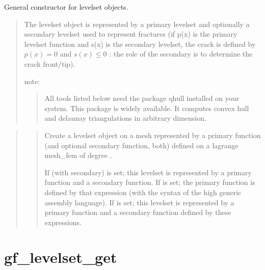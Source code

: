 \documentclass[a4paper,11pt,english]{sphinxmanual}
\begin{document}
\sphinxAtStartPar
{}

\sphinxAtStartPar
General constructor for levelset objects.
\begin{quote}

\sphinxAtStartPar
The level\sphinxhyphen{}set object is represented by a primary level\sphinxhyphen{}set and optionally
a secondary level\sphinxhyphen{}set used to represent fractures (if p(x) is the primary
level\sphinxhyphen{}set function and s(x) is the secondary level\sphinxhyphen{}set, the crack is
defined by \(p(x)=0\) and \(s(x)\leq0\) : the role of the secondary is to determine
the crack front/tip).

\sphinxAtStartPar
note:
\begin{quote}

\sphinxAtStartPar
All tools listed below need the package qhull installed on your
system. This package is widely available. It computes convex hull and
delaunay triangulations in arbitrary dimension.
\end{quote}
\end{quote}

\sphinxAtStartPar
{}
\begin{quote}

\sphinxAtStartPar
{}
\begin{quote}

\sphinxAtStartPar
Create a levelset object on a mesh represented by a primary function
(and optional secondary function, both) defined on a lagrange mesh\_fem of
degree .

\sphinxAtStartPar
If  (with secondary) is set; this levelset is represented by a
primary function and a secondary function. If  is set; the primary
function is defined by that expression (with the syntax of the high
generic assembly language). If  is set; this levelset
is represented by a primary function and a secondary function defined
by these expressions.
\end{quote}
\end{quote}


\section{gf\_levelset\_get}
\label{\detokenize{matlab_octave/cmdref_gf_levelset_get:gf-levelset-get}}\label{\detokenize{matlab_octave/cmdref_gf_levelset_get::doc}}
\sphinxAtStartPar
{}
\end{document}
